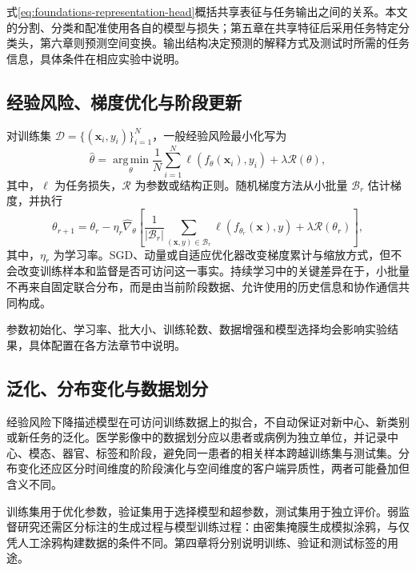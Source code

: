 式\eqref{eq:foundations-representation-head}概括共享表征与任务输出之间的关系。本文的分割、分类和配准使用各自的模型与损失；第五章在共享特征后采用任务特定分类头，第六章则预测空间变换。输出结构决定预测的解释方式及测试时所需的任务信息，具体条件在相应实验中说明。

\subsection{经验风险、梯度优化与阶段更新}
\label{subsec:foundations-empirical-risk}

对训练集 $\mathcal{D}=\{(\mathbf{x}_i,y_i)\}_{i=1}^{N}$，一般经验风险最小化写为
\begin{equation}
\widehat{\theta}
=
\operatorname*{arg\,min}_{\theta}
\frac{1}{N}\sum_{i=1}^{N}
\ell\!\left(f_{\theta}(\mathbf{x}_i),y_i\right)
+
\lambda\mathcal{R}(\theta),
\label{eq:foundations-erm}
\end{equation}
其中，$\ell$ 为任务损失，$\mathcal{R}$ 为参数或结构正则。随机梯度方法从小批量 $\mathcal{B}_r$ 估计梯度，并执行
\begin{equation}
\theta_{r+1}
=
\theta_r-
\eta_r\widehat{\nabla}_{\theta}
\left[
\frac{1}{|\mathcal{B}_r|}
\sum_{(\mathbf{x},y)\in\mathcal{B}_r}
\ell\!\left(f_{\theta_r}(\mathbf{x}),y\right)
+
\lambda\mathcal{R}(\theta_r)
\right],
\label{eq:foundations-sgd-update}
\end{equation}
其中，$\eta_r$ 为学习率。SGD、动量或自适应优化器改变梯度累计与缩放方式，但不会改变训练样本和监督是否可访问这一事实。持续学习中的关键差异在于，小批量不再来自固定联合分布，而是由当前阶段数据、允许使用的历史信息和协作通信共同构成。

参数初始化、学习率、批大小、训练轮数、数据增强和模型选择均会影响实验结果，具体配置在各方法章节中说明。

\subsection{泛化、分布变化与数据划分}
\label{subsec:foundations-generalization-boundary}

经验风险下降描述模型在可访问训练数据上的拟合，不自动保证对新中心、新类别或新任务的泛化。医学影像中的数据划分应以患者或病例为独立单位，并记录中心、模态、器官、标签和阶段，避免同一患者的相关样本跨越训练集与测试集。分布变化还应区分时间维度的阶段演化与空间维度的客户端异质性，两者可能叠加但含义不同。

训练集用于优化参数，验证集用于选择模型和超参数，测试集用于独立评价。弱监督研究还需区分标注的生成过程与模型训练过程：由密集掩膜生成模拟涂鸦，与仅凭人工涂鸦构建数据的条件不同。第四章将分别说明训练、验证和测试标签的用途。

